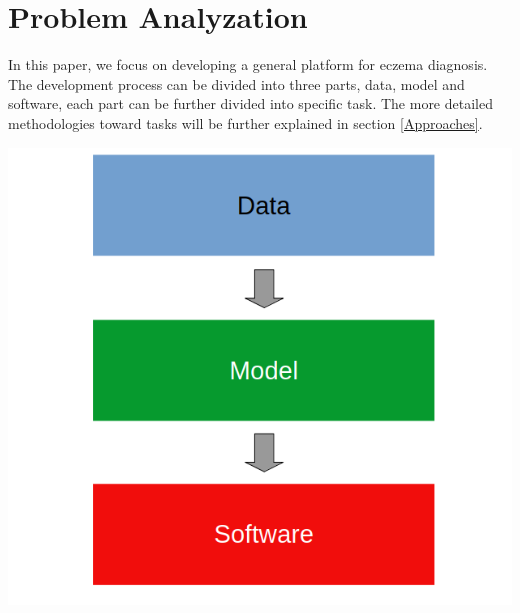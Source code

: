\section{Problem Analyzation}\label{problem}
    In this paper, we focus on developing a general platform for eczema diagnosis. The development process can be divided into three parts, data, model and software, each part can be further divided into specific task. The more detailed methodologies toward tasks will be further explained in section \ref{Approaches}.
    \begin{Figure}
        \centering
        \includegraphics[width=\linewidth]{Image/WorkFlow.png}
    \end{Figure}
